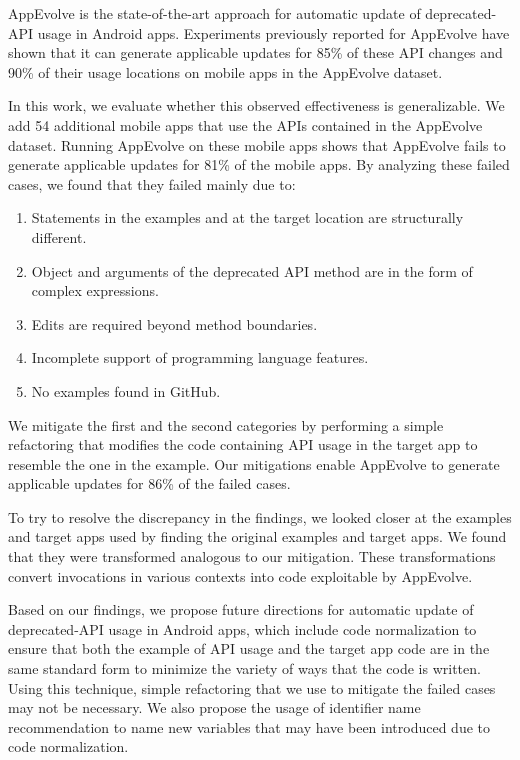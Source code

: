 AppEvolve is the state-of-the-art approach for automatic update of
deprecated-API usage in Android apps. Experiments previously reported for
AppEvolve have shown that it can generate applicable updates for
85\% of these API
changes and 90\% of their usage locations on mobile apps in the
AppEvolve dataset.

In this work, we evaluate whether this observed effectiveness is
generalizable. We add 54 additional mobile apps that use the APIs contained
in the AppEvolve dataset. Running AppEvolve on these mobile apps shows that
AppEvolve fails to generate applicable updates for 81\% of the mobile
apps. By analyzing these failed cases, we found that they failed mainly
due to:
\begin{enumerate}
    \item Statements in the examples and at the target location are structurally different.
    \item Object and arguments of the deprecated API method are in the form of complex expressions.
    \item Edits are required beyond method boundaries.
    \item Incomplete support of programming language features.
    \item No examples found in GitHub.
\end{enumerate}
We mitigate the first and the second categories by performing a simple
refactoring that modifies the code containing API usage in the target app
to resemble the one in the example. Our mitigations enable AppEvolve
to generate applicable updates for 86\% of the failed cases.

To try to resolve the discrepancy in the findings, we looked closer at the
examples and target apps used by finding the original examples and target
apps. We found that they were transformed analogous to our mitigation.
These transformations convert invocations in various contexts into code
exploitable by AppEvolve.

Based on our findings, we propose future directions for automatic update of
deprecated-API usage in Android apps, which include code normalization to
ensure that both the example of API usage and the target app code are in
the same standard form to minimize the variety of ways that the code is
written. Using this technique, simple refactoring that we use to mitigate
the failed cases may not be necessary. We also propose the usage of
identifier name recommendation to name new variables that may have been
introduced due to code normalization.
